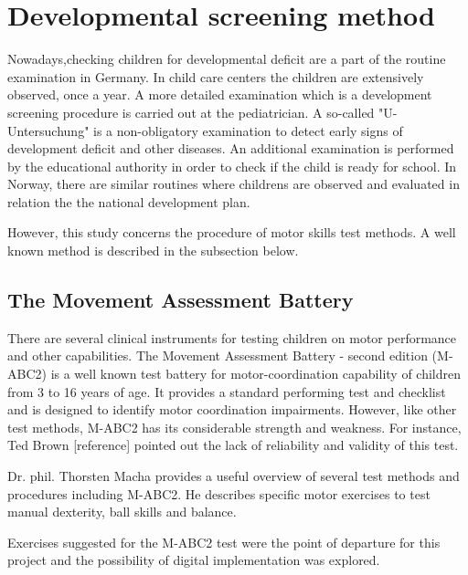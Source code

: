 \section{Developmental screening method}
\label{sec:screeningmethod}
Nowadays,checking children for developmental deficit are a part of the routine examination in Germany. In child care centers the children are extensively observed, once a year.
A more detailed examination which is a development screening procedure is carried out at the pediatrician. A so-called "U-Untersuchung" is a non-obligatory examination to detect early signs of development deficit and other diseases.
An additional examination is performed by the educational authority in order to check if the child is ready for school.
In Norway, there are similar routines where childrens are observed and evaluated in relation the the national development plan.

However, this study concerns the procedure of motor skills test methods. A well known method is described in the subsection below. 




\subsection{The Movement Assessment Battery}
There are several clinical instruments for testing children on motor performance and other capabilities. The Movement Assessment Battery - second edition (M-ABC2) is a well known test battery for motor-coordination capability of children from 3 to 16 years of age. It provides a standard performing test and checklist and is designed to identify motor coordination impairments. However, like other test methods, M-ABC2 has its considerable strength and weakness. For instance, Ted Brown [reference] pointed out the lack of reliability and validity of this test.

Dr. phil. Thorsten Macha provides a useful overview of several test methods and procedures including M-ABC2. He describes specific motor exercises to test manual dexterity, ball skills and balance. 

Exercises suggested for the M-ABC2 test were the point of departure for this project and the possibility of digital implementation was explored.



